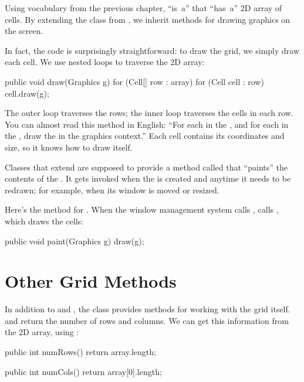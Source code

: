 
Using vocabulary from the previous chapter,  ``is~a''  that ``has~a'' 2D array of cells.
By extending the  class from , we inherit methods for drawing graphics on the screen.


In fact, the code is surprisingly straightforward: to draw the grid, we simply draw each cell.
We use nested  loops to traverse the 2D array:

\begin{code}
public void draw(Graphics g) {
    for (Cell[] row : array) {
        for (Cell cell : row) {
            cell.draw(g);
        }
    }
}
\end{code}

The outer loop traverses the rows; the inner loop traverses the cells in each row.
You can almost read this method in English: ``For each  in the , and for each  in the , draw the  in the graphics context.''
Each cell contains its coordinates and size, so it knows how to draw itself.

Classes that extend  are supposed to provide a method called  that ``paints'' the contents of the .
It gets invoked when the  is created and anytime it needs to be redrawn; for example, when its window is moved or resized.

Here's the  method for .
When the window management system calls ,  calls , which draws the cells:

\begin{code}
public void paint(Graphics g) {
    draw(g);
}
\end{code}


\section{Other Grid Methods}

In addition to  and , the  class provides methods for working with the grid itself.
 and  return the number of rows and columns.
We can get this information from the 2D array, using :

\begin{code}
public int numRows() {
    return array.length;
}

public int numCols() {
    return array[0].length;
}
\end{code}

